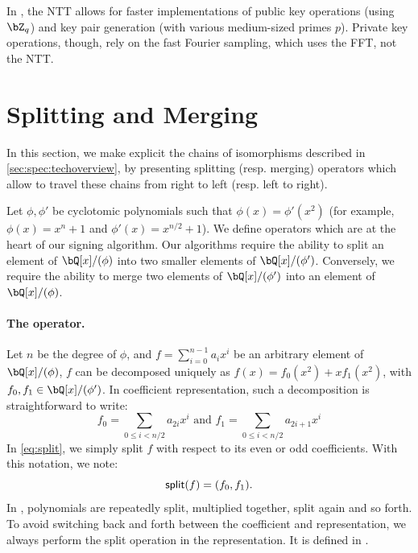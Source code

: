  In \falcon, the NTT allows for faster
 implementations of public key operations (using $\bZ_q$) and key pair
 generation (with various medium-sized primes $p$). Private key
 operations, though, rely on the fast Fourier sampling, which uses the
 FFT, not the NTT.

 \section{Splitting and Merging} \label{sec:spec:splitmerge}

 In this section, we make explicit the chains of isomorphisms described in \cref{sec:spec:techoverview}, by presenting splitting (resp. merging) operators which allow to travel these chains from right to left (resp. left to right).

 Let $\phi, \phi'$ be cyclotomic polynomials such that $\phi(x) = \phi'(x^2)$ (for example, $\phi(x) = x^n + 1$ and $\phi'(x) = x^{n/2} + 1$). We define operators which are at the heart of our signing algorithm. Our algorithms require the ability to split an element of $\bQ[x]/(\phi)$ into two smaller elements of $\bQ[x]/(\phi')$. Conversely, we require the ability to merge two elements of $\bQ[x]/(\phi')$ into an element of $\bQ[x]/(\phi)$.


 \paragraph{The \splitfft operator.} Let $n$ be the degree of $\phi$, and $f = \sum_{i=0}^{n-1} a_i x^i$ be an arbitrary element of $\bQ[x]/(\phi)$, $f$ can be decomposed uniquely as $f(x) = f_0(x^2) + xf_1(x^2)$, with $f_0, f_1 \in \bQ[x]/(\phi')$. In coefficient representation, such a decomposition is straightforward to write:
 \begin{equation}\label{eq:split}
 f_0 = \sum\limits_{0 \leq i < n/2} a_{2i} x^i \text{\ \ \ and\ \ \ }f_1 = \sum\limits_{0 \leq i < n/2} a_{2i+1} x^i
 \end{equation}
 In \eqref{eq:split}, we simply split $f$ with respect to its even or odd coefficients. With this notation, we note:
 \begin{equation}\label{eq:splitdef}
 \textsf{split}(f) = (f_0,f_1).
 \end{equation}
 In \falcon, polynomials are repeatedly split, multiplied together, split again and so forth. To avoid switching back and forth between the coefficient and \fft representation, we always perform the split operation in the \fft representation. It is defined in \longsplitfft.


